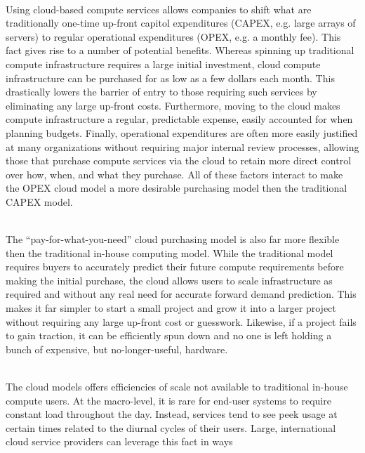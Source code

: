 \begin{packed_desc}
\item[OPEX vs CAPEX] \hfill \\ Using cloud-based compute services
  allows companies to shift what are traditionally one-time up-front
  capitol expenditures (CAPEX, e.g. large arrays of servers) to
  regular operational expenditures (OPEX, e.g. a monthly fee). This
  fact gives rise to a number of potential benefits. Whereas spinning
  up traditional compute infrastructure requires a large initial
  investment, cloud compute infrastructure can be purchased for as low
  as a few dollars each month. This drastically lowers the barrier of
  entry to those requiring such services by eliminating any large
  up-front costs. Furthermore, moving to the cloud makes compute
  infrastructure a regular, predictable expense, easily accounted for
  when planning budgets. Finally, operational expenditures are often
  more easily justified at many organizations without requiring major
  internal review processes, allowing those that purchase compute
  services via the cloud to retain more direct control over how, when,
  and what they purchase. All of these factors interact to make the
  OPEX cloud model a more desirable purchasing model then the
  traditional CAPEX model.
\item[Flexibility] \hfill \\ The ``pay-for-what-you-need'' cloud
  purchasing model is also far more flexible then the traditional
  in-house computing model. While the traditional model requires
  buyers to accurately predict their future compute requirements
  before making the initial purchase, the cloud allows users to scale
  infrastructure as required and without any real need for accurate
  forward demand prediction. This makes it far simpler to start a
  small project and grow it into a larger project without requiring
  any large up-front cost or guesswork. Likewise, if a project fails
  to gain traction, it can be efficiently spun down and no one is left
  holding a bunch of expensive, but no-longer-useful, hardware.
\item[Efficiency] \hfill \\ The cloud models offers efficiencies of
  scale not available to traditional in-house compute users. At the
  macro-level, it is rare for end-user systems to require constant
  load throughout the day. Instead, services tend to see peek usage at
  certain times related to the diurnal cycles of their users. Large,
  international cloud service providers can leverage this fact in ways

\end{packed_desc}
